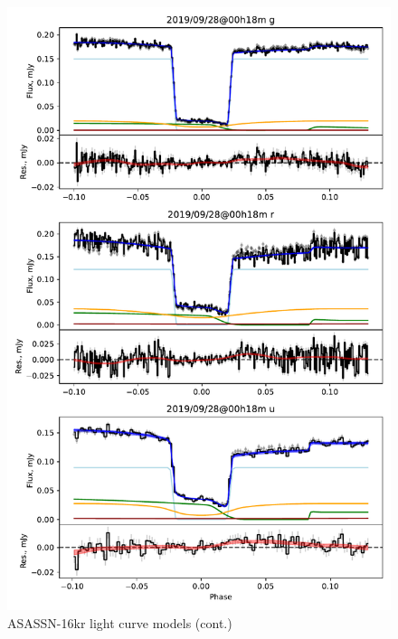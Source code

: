 \begin{figure}
    \centering
    \includegraphics[width=\textwidth]{figures/results/three_cvs_with_weird_colours/ASASSN-16kr/ASASSN-16kr_5.pdf}
    \caption{ASASSN-16kr light curve models (cont.)}
    \label{fig:ASASSN-16kr all light curves cont 4}
\end{figure}

